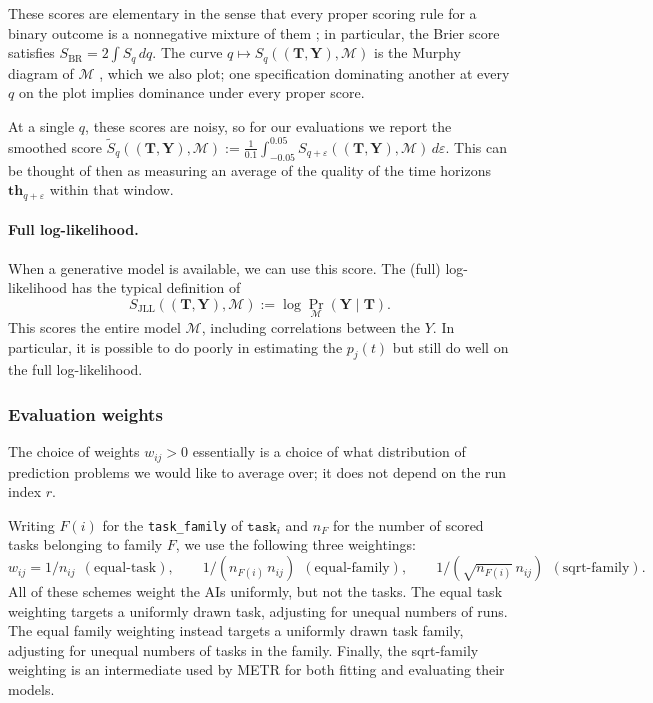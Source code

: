 \documentclass{article}
\theoremstyle{definition}
\newcommand{\thq}[1][q]{\mathbf{th}_{#1}}
\newcommand{\task}{\texttt{task}}
\begin{document}
These scores are elementary in the sense that every proper scoring rule for a binary outcome is a nonnegative mixture of them \citep{schervishGeneralMethodComparing1989}; in particular, the Brier score satisfies $S_{\mathrm{BR}} = 2\int S_q\, dq$. The curve $q \mapsto S_{q}((\mathbf{T}, \mathbf{Y}), \mathcal{M}) $ is the Murphy diagram of $\mathcal{M}$ \citep{ehmQuantilesExpectilesConsistent2016}, which we also plot; one specification dominating another at every $q$ on the plot implies dominance under every proper score. 

At a single $q$, these scores are noisy, so for our evaluations we report the smoothed score $\tilde S_q((\mathbf{T}, \mathbf{Y}), \mathcal{M}) := \frac{1}{0.1}\int_{-0.05}^{0.05} S_{q + \varepsilon}((\mathbf{T}, \mathbf{Y}), \mathcal{M})\,  d\varepsilon$. This can be thought of then as measuring an average of the quality of the time horizons $\thq[q + \varepsilon]$ within that window. 

\paragraph{Full log-likelihood.} When a generative model is available, we can use this score. The (full) log-likelihood has the typical definition of
\[
    S_{\mathrm{JLL}}((\mathbf{T}, \mathbf{Y}), \mathcal{M}) := \log \Pr_\mathcal{M}(\mathbf{Y} \mid \mathbf{T}).
\]
This scores the entire model $\mathcal{M}$, including correlations between the $Y$. In particular, it is possible to do poorly in estimating the $p_j(t)$ but still do well on the full log-likelihood.

\subsubsection{Evaluation weights}\label{sec:weights}

The choice of weights $w_{ij} > 0$ essentially is a choice of what distribution of prediction problems we would like to average over; it does not depend on the run index $r$.

Writing $F(i)$ for the \texttt{task\_family} of $\task_i$ and $n_F$ for the number of scored tasks belonging to family $F$, we use the following three weightings:
\[
    w_{ij} = 1/n_{ij} \ \ (\text{equal-task}), \qquad
    1/(n_{F(i)}\, n_{ij}) \ \ (\text{equal-family}), \qquad
    1/(\sqrt{n_{F(i)}}\, n_{ij}) \ \ (\text{sqrt-family}).
\]
All of these schemes weight the AIs uniformly, but not the tasks. The equal task weighting targets a uniformly drawn task, adjusting for unequal numbers of runs. The equal family weighting instead targets a uniformly drawn task family, adjusting for unequal numbers of tasks in the family. Finally, the sqrt-family weighting is an intermediate used by METR for both fitting and evaluating their models. 
\end{document}
